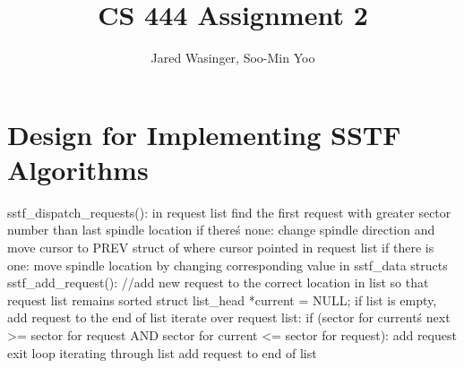 \documentclass[letterpaper,10pt]{article}
\title{CS 444 Assignment 2}
\author{Jared Wasinger, Soo-Min Yoo}
\begin{document}
\maketitle
\newpage

\section*{Design for Implementing SSTF Algorithms}
	sstf\_dispatch\_requests():
    \newline in request list find the first request with greater sector number than last spindle location
    \newline if there\'s none:
	\newline change spindle direction and move cursor to PREV struct of where cursor pointed in request list
	\newline if there is one:
	\newline move spindle location by changing corresponding value in sstf\_data structs
    \newline
    \newline sstf\_add\_request():
	\newline //add new request to the correct location in list so that request list remains sorted
	\newline struct list\_head *current = NULL;
	\newline if list is empty, add request to the end of list
	\newline iterate over request list:
	\newline if (sector for current\'s next \textgreater= sector for request AND sector for current \textless= sector for request):
	\newline add request
    \newline exit loop iterating through list
	\newline add request to end of list
\end{document}
